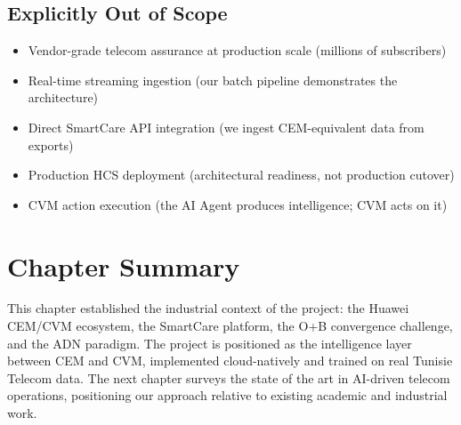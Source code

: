 \subsection{Explicitly Out of Scope}

\begin{itemize}
  \item Vendor-grade telecom assurance at production scale (millions of subscribers)
  \item Real-time streaming ingestion (our batch pipeline demonstrates the architecture)
  \item Direct SmartCare API integration (we ingest CEM-equivalent data from exports)
  \item Production HCS deployment (architectural readiness, not production cutover)
  \item CVM action execution (the AI Agent produces intelligence; CVM acts on it)
\end{itemize}

\section{Chapter Summary}

This chapter established the industrial context of the project: the Huawei CEM/CVM ecosystem, the SmartCare platform, the O+B convergence challenge, and the ADN paradigm. The project is positioned as the intelligence layer between CEM and CVM, implemented cloud-natively and trained on real Tunisie Telecom data. The next chapter surveys the state of the art in AI-driven telecom operations, positioning our approach relative to existing academic and industrial work.
